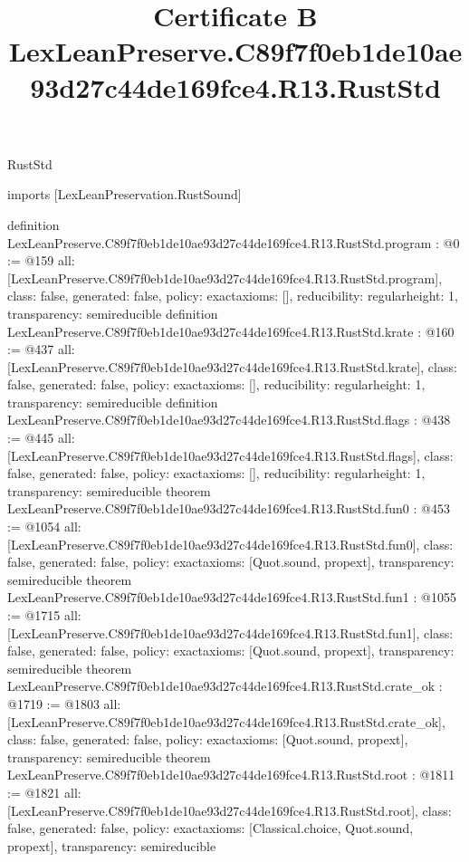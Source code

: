 \begin{lexlean}{RustStd}
\title{Certificate B LexLeanPreserve.C89f7f0eb1de10ae93d27c44de169fce4.R13.RustStd}
\begin{coremodule}
imports [LexLeanPreservation.RustSound]

definition LexLeanPreserve.C89f7f0eb1de10ae93d27c44de169fce4.R13.RustStd.program : @0 := @159 {
  all: [LexLeanPreserve.C89f7f0eb1de10ae93d27c44de169fce4.R13.RustStd.program],
  class: false,
  generated: false,
  policy: exact{axioms: []},
  reducibility: regular{height: 1},
  transparency: semireducible
}
definition LexLeanPreserve.C89f7f0eb1de10ae93d27c44de169fce4.R13.RustStd.krate : @160 := @437 {
  all: [LexLeanPreserve.C89f7f0eb1de10ae93d27c44de169fce4.R13.RustStd.krate],
  class: false,
  generated: false,
  policy: exact{axioms: []},
  reducibility: regular{height: 1},
  transparency: semireducible
}
definition LexLeanPreserve.C89f7f0eb1de10ae93d27c44de169fce4.R13.RustStd.flags : @438 := @445 {
  all: [LexLeanPreserve.C89f7f0eb1de10ae93d27c44de169fce4.R13.RustStd.flags],
  class: false,
  generated: false,
  policy: exact{axioms: []},
  reducibility: regular{height: 1},
  transparency: semireducible
}
theorem LexLeanPreserve.C89f7f0eb1de10ae93d27c44de169fce4.R13.RustStd.fun0 : @453 := @1054 {
  all: [LexLeanPreserve.C89f7f0eb1de10ae93d27c44de169fce4.R13.RustStd.fun0],
  class: false,
  generated: false,
  policy: exact{axioms: [Quot.sound, propext]},
  transparency: semireducible
}
theorem LexLeanPreserve.C89f7f0eb1de10ae93d27c44de169fce4.R13.RustStd.fun1 : @1055 := @1715 {
  all: [LexLeanPreserve.C89f7f0eb1de10ae93d27c44de169fce4.R13.RustStd.fun1],
  class: false,
  generated: false,
  policy: exact{axioms: [Quot.sound, propext]},
  transparency: semireducible
}
theorem LexLeanPreserve.C89f7f0eb1de10ae93d27c44de169fce4.R13.RustStd.crate_ok : @1719 := @1803 {
  all: [LexLeanPreserve.C89f7f0eb1de10ae93d27c44de169fce4.R13.RustStd.crate_ok],
  class: false,
  generated: false,
  policy: exact{axioms: [Quot.sound, propext]},
  transparency: semireducible
}
theorem LexLeanPreserve.C89f7f0eb1de10ae93d27c44de169fce4.R13.RustStd.root : @1811 := @1821 {
  all: [LexLeanPreserve.C89f7f0eb1de10ae93d27c44de169fce4.R13.RustStd.root],
  class: false,
  generated: false,
  policy: exact{axioms: [Classical.choice, Quot.sound, propext]},
  transparency: semireducible
}


\end{coremodule}
\end{lexlean}
